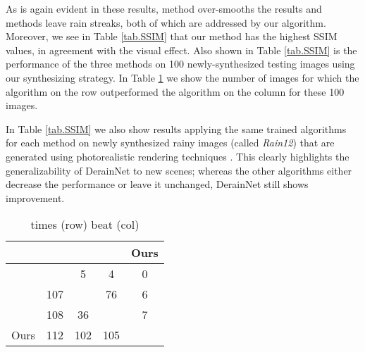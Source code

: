 \documentclass[journal]{IEEEtran}
\begin{document}
As is again evident in these results, method \cite{13} over-smooths the results and methods \cite{16,34} leave rain streaks, both of which are addressed by our algorithm. Moreover, we see in Table \ref{tab.SSIM} that our method has the highest SSIM values, in agreement with the visual effect. Also shown in Table \ref{tab.SSIM} is the performance of the three methods on 100 newly-synthesized testing images using our synthesizing strategy. In Table \ref{tab:matrix} we show the number of images for which the algorithm on the row outperformed the algorithm on the column for these 100 images.

In Table \ref{tab.SSIM} we also show results applying the same trained algorithms for each method on  newly synthesized rainy images (called \emph{Rain12}) \cite{34} that are generated using photorealistic rendering techniques \cite{2}. This clearly highlights the generalizability of DerainNet to new scenes; whereas the other algorithms either decrease the performance or leave it unchanged, DerainNet still shows improvement.

\begin{table}
\centering
\caption{ times (row) beat (col)}\label{tab:matrix}
\begin{tabular}{|r|c|c|c|c|} \hline
 & \cite{13} & \cite{16} & \cite{34} &Ours \\ \hline
\cite{13} &  & 5 & 4& 0\\   \hline
\cite{16} &107 &  &76 & 6\\   \hline
\cite{34} & 108 & 36& &7 \\  \hline
Ours & 112 & 102 & 105&\\   \hline
\end{tabular}
\end{table}
\end{document}
